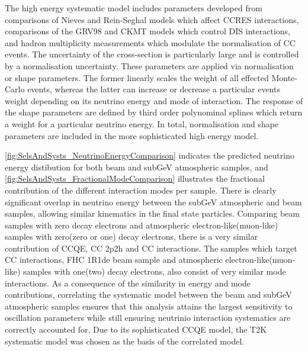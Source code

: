 The high energy systematic model includes parameters developed from comparisons of Nieves and Rein-Seghal models which affect CCRES interactions, comparisons of the GRV98 and CKMT models which control DIS interactions, and hadron multiplicity measurements which modulate the normalisation of CC events. The uncertainty of the \quickmath{\nu_{\tau}} cross-section is particularly large and is controlled by a  normalisation uncertainty. These parameters are applied via normalisation or shape parameters. The former linearly scales the weight of all effected Monte-Carlo events, whereas the latter can increase or decrease a particular events weight depending on its neutrino energy and mode of interaction. The response of the shape parameters are defined by third order polynominal splines which return a weight for a particular neutrino energy. In total,  normalisation and  shape parameters are included in the more sophisticated high energy model.

\autoref{fig:SelsAndSysts_NeutrinoEnergyComparison} indicates the predicted neutrino energy distibution for both beam and subGeV atmospheric samples, and \autoref{fig:SelsAndSysts_FractionalModeComparison} illustrates the fractional contribution of the different interaction modes per sample. There is clearly significant overlap in neutrino energy between the subGeV atmospheric and beam samples, allowing similar kinematics in the final state particles. Comparing beam samples with zero decay electrons and atmospheric electron-like(muon-like) samples with zero(zero or one) decay electrons, there is a very similar contribution of CCQE, CC 2p2h and CC\quickmath{1\pi^{\pm}} interactions. The samples which target CC\quickmath{1\pi^{\pm}} interactions, FHC 1R1de beam sample and atmospheric electron-like(muon-like) samples with one(two) decay electrons, also consist of very similar mode interactions. As a consequence of the similarity in energy and mode contributions, correlating the systematic model between the beam and subGeV atmospheric samples ensures that this analysis attains the largest sensitivity to oscillation parameters while still ensuring neutrinio interaction systematics are correctly accounted for. Due to its sophisticated CCQE model, the T2K systematic model was chosen as the basis of the correlated model. 

